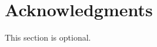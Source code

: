 \documentclass{acm_proc_article-csis8101}
\begin{document}







\section{Acknowledgments}
This section is optional.
%


\end{document}
